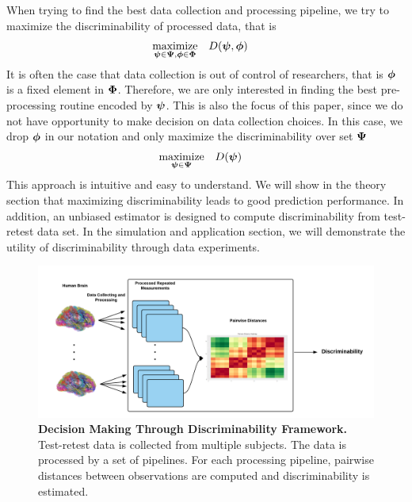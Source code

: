\documentclass{article}
\begin{document}
 When trying to find the best data collection and processing pipeline, we try to maximize the discriminability of processed data, that is  
\begin{equation} 
\begin{aligned}
& \underset{\boldsymbol{\psi} \in \boldsymbol{\Psi},\boldsymbol{\phi} \in \boldsymbol{\Phi}}{\text{maximize}}
& & D(\boldsymbol{\psi},\boldsymbol{\phi})
\end{aligned}
\end{equation}
It is often the case that data collection is out of control of researchers, that is $\boldsymbol{\phi}$ is a fixed element in $\boldsymbol{\Phi}$. Therefore, we are only interested in finding the best pre-processing routine encoded by $\boldsymbol{\psi}$. This is also the focus of this paper, since we do not have opportunity to make decision on data collection choices. In this case, we drop $\boldsymbol{\phi}$ in our notation and only maximize the discriminability over set $\boldsymbol{\Psi}$
\begin{equation} 
\begin{aligned}
& \underset{\boldsymbol{\psi} \in \boldsymbol{\Psi}}{\text{maximize}}
& & D(\boldsymbol{\psi})
\end{aligned}
\end{equation}
This approach is intuitive and easy to understand. We will show in the theory section that maximizing discriminability leads to good prediction performance. In addition, an unbiased estimator is designed to compute discriminability from test-retest data set. In the simulation and application section, we will demonstrate the utility of discriminability through data experiments.

\begin{figure}[ht!]
	\includegraphics[width=\linewidth]{../Figs/flow_chart.png}
	\caption{{\bf Decision Making Through Discriminability Framework.} Test-retest data is collected from multiple subjects. The data is processed by a set of pipelines. For each processing pipeline, pairwise distances between observations are computed and discriminability is estimated. }
	\label{fig:fc}
\end{figure}
\end{document}
